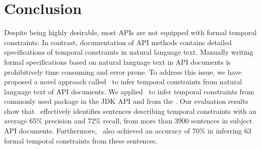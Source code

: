 \section{Conclusion}
\label{sec:conclusion}

Despite being highly desirable, most APIs are not equipped with formal temporal constraints.
In contrast, documentation of API methods contains detailed specifications of temporal constraints in natural language text.
Manually writing formal specifications based on natural language text in API documents is prohibitively time consuming and error prone.
To address this issue, we have proposed a novel approach called \tool\ to infer temporal constraints from natural language text of API documents.
We applied \tool\ to infer temporal constraints from 
commonly used package  in the JDK API and from the \amazonAPI.
Our evaluation results show that \tool\ effectively identifies sentences describing
temporal constraints with an average 65\% precision and 72\% recall,
from more than 3900 sentences in subject API documents.
Furthermore, \tool\ also achieved an accuracy of
70\% in inferring 63 formal temporal constraints from these sentences.
